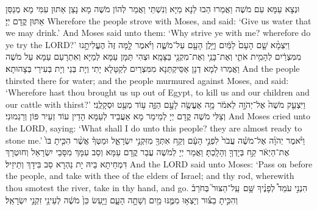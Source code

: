 {{}
{וּנְצָא עַמָּא עִם מֹשֶׁה וַאֲמַרוּ הַבוּ לַנָא מַיָּא וְנִשְׁתֵּי וַאֲמַר לְהוֹן מֹשֶׁה מָא נָצַן אַתּוּן עִמִּי מָא מְנַסַּן אַתּוּן קֳדָם יְיָ׃}
{Wherefore the people strove with Moses, and said: ‘Give us water that we may drink.’ And Moses said unto them: ‘Why strive ye with me? wherefore do ye try the LORD?’}{}
{וַיִּצְמָ֨א שָׁ֤ם הָעָם֙ לַמַּ֔יִם וַיָּ֥לֶן הָעָ֖ם עַל־מֹשֶׁ֑ה וַיֹּ֗אמֶר לָ֤מָּה זֶּה֙ הֶעֱלִיתָ֣נוּ מִמִּצְרַ֔יִם לְהָמִ֥ית אֹתִ֛י וְאֶת־בָּנַ֥י וְאֶת־מִקְנַ֖י בַּצָּמָֽא׃}
{וּצְהִי תַּמָּן עַמָּא לְמַיָּא וְאִתְרָעַם עַמָּא עַל מֹשֶׁה וַאֲמַרוּ לְמָא דְנָן אַסֵּיקְתַּנָא מִמִּצְרַיִם לְקַטָּלָא יָתִי וְיָת בְּנַי וְיָת בְּעִירַי בְּצָהוּתָא׃}
{And the people thirsted there for water; and the people murmured against Moses, and said: ‘Wherefore hast thou brought us up out of Egypt, to kill us and our children and our cattle with thirst?’}{}
{וַיִּצְעַ֤ק מֹשֶׁה֙ אֶל־יְהֹוָ֣ה לֵאמֹ֔ר מָ֥ה אֶעֱשֶׂ֖ה לָעָ֣ם הַזֶּ֑ה ע֥וֹד מְעַ֖ט וּסְקָלֻֽנִי׃
}
{וְצַלִּי מֹשֶׁה קֳדָם יְיָ לְמֵימַר מָא אַעֲבֵיד לְעַמָּא הָדֵין עוֹד זְעֵיר פּוֹן וְרַגְמוּנִי׃}
{And Moses cried unto the LORD, saying: ‘What shall I do unto this people? they are almost ready to stone me.’}{}
{וַיֹּ֨אמֶר יְהֹוָ֜ה אֶל־מֹשֶׁ֗ה עֲבֹר֙ לִפְנֵ֣י הָעָ֔ם וְקַ֥ח אִתְּךָ֖ מִזִּקְנֵ֣י יִשְׂרָאֵ֑ל וּמַטְּךָ֗ אֲשֶׁ֨ר הִכִּ֤יתָ בּוֹ֙ אֶת־הַיְאֹ֔ר קַ֥ח בְּיָדְךָ֖ וְהָלָֽכְתָּ׃
}
{וַאֲמַר יְיָ לְמֹשֶׁה עֲבַר קֳדָם עַמָּא וְסַב עִמָּךְ מִסָּבֵי יִשְׂרָאֵל וְחוּטְרָךְ דִּמְחֵיתָא בֵיהּ יָת נַהְרָא סַב בִּידָךְ וְתֵיזֵיל׃}
{And the LORD said unto Moses: ‘Pass on before the people, and take with thee of the elders of Israel; and thy rod, wherewith thou smotest the river, take in thy hand, and go.}{}
{הִנְנִ֣י עֹמֵד֩ לְפָנֶ֨יךָ שָּׁ֥ם \pasek  עַֽל־הַצּוּר֮ בְּחֹרֵב֒ וְהִכִּ֣יתָ בַצּ֗וּר וְיָצְא֥וּ מִמֶּ֛נּוּ מַ֖יִם וְשָׁתָ֣ה הָעָ֑ם וַיַּ֤עַשׂ כֵּן֙ מֹשֶׁ֔ה לְעֵינֵ֖י זִקְנֵ֥י יִשְׂרָאֵֽל׃
}}

